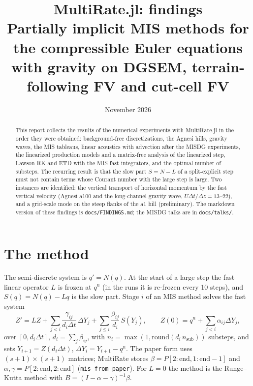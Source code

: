 \documentclass[11pt,a4paper]{article}
\title{MultiRate.jl: findings\\[2pt]\large Partially implicit MIS methods for the compressible Euler
equations with gravity on DGSEM, terrain-following FV and cut-cell FV}
\author{}
\date{November 2026}
\newcommand{\code}[1]{\texttt{#1}}
\newcommand{\dt}{\Delta t}
\begin{document}
\maketitle

\begin{abstract}
This report collects the results of the numerical experiments with MultiRate.jl in the order they
were obtained: background-free discretizations, the Agnesi hills, gravity waves, the MIS tableaus,
linear acoustics with advection after the MISDG experiments, the linearized production models and
a matrix-free analysis of the linearized step, Lawson RK and ETD with the MIS fast integrators, and the optimal number of substeps. The recurring result is that the slow part
$S = N - L$ of a split-explicit step must not contain terms whose Courant number with the large step
is large. Two instances are identified: the vertical transport of horizontal momentum by the fast
vertical velocity (Agnesi a100 and the long-channel gravity wave, $U\dt/\Delta z = 13$--$22$), and a
grid-scale mode on the steep flanks of the a1 hill (preliminary). The markdown version of these
findings is \code{docs/FINDINGS.md}; the MISDG talks are in \code{docs/talks/}.
\end{abstract}

\tableofcontents

\section{The method}

The semi-discrete system is $q' = N(q)$. At the start of a large step the fast linear operator $L$
is frozen at $q^n$ (in the runs it is re-frozen every 10 steps), and $S(q) = N(q) - L q$ is the slow
part. Stage $i$ of an MIS method solves the fast system
\begin{equation}
  Z' = L Z + \sum_{j<i} \frac{\gamma_{ij}}{d_i\dt}\,\Delta Y_j + \sum_{j\le i}\frac{\beta_{ij}}{d_i}\,S(Y_j),
  \qquad Z(0) = q^n + \sum_{j<i}\alpha_{ij}\Delta Y_j,
\end{equation}
over $[0, d_i\dt]$, $d_i = \sum_j\beta_{ij}$, with $n_i = \max(1, \mathrm{round}(d_i\,n_\mathrm{sub}))$
substeps, and sets $Y_{i+1} = Z(d_i\dt)$, $\Delta Y_i = Y_{i+1} - q^n$. The paper form uses
$(s+1)\times(s+1)$ matrices; MultiRate stores $\beta = P[2{:}\mathrm{end}, 1{:}\mathrm{end}-1]$ and
$\alpha,\gamma = P[2{:}\mathrm{end},2{:}\mathrm{end}]$ (\code{mis\_from\_paper}). For $L = 0$ the
method is the Runge--Kutta method with $B = (I-\alpha-\gamma)^{-1}\beta$.
\end{document}
